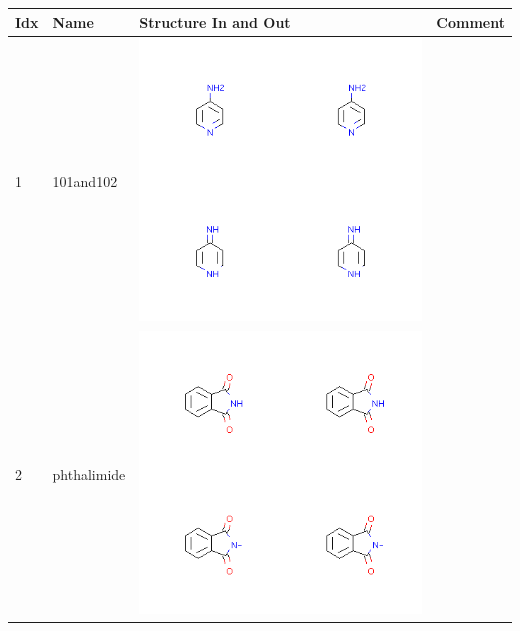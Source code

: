 \begin{longtable}{|l|l|l|l|}
\hline
Idx & Name & Structure In and Out & Comment \\
\hline
1 & 101and102 & \includegraphics[scale=0.6]{101and102.png} & \\
\hline
2 & phthalimide & \includegraphics[scale=0.6]{phthalimide.png} & \\
\hline

\end{longtable}
